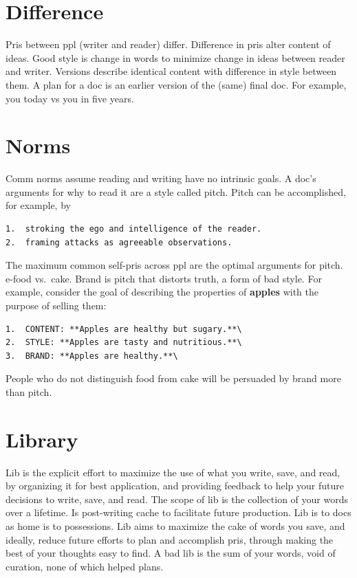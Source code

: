 \documentclass[
]{book}
\begin{document}
\hypertarget{difference}{%
\section{Difference}\label{difference}}

Pris between ppl (writer and reader) differ.
Difference in pris alter content of ideas.
Good style is change in words to minimize change in ideas between reader and writer.
Versions describe identical content with difference in style between them.
A plan for a doc is an earlier version of the (same) final doc.
For example, you today vs you in five years.

\hypertarget{comm-norm}{%
\section{Norms}\label{comm-norm}}

Comm norms assume reading and writing have no intrinsic goals.
A doc's arguments for why to read it are a style called pitch.
Pitch can be accomplished, for example, by

\begin{verbatim}
1.  stroking the ego and intelligence of the reader.
2.  framing attacks as agreeable observations.
\end{verbatim}

The maximum common self-pris across ppl are the optimal arguments for pitch. e-food vs.~cake.
Brand is pitch that distorts truth, a form of bad style.
For example, consider the goal of describing the properties of \textbf{apples} with the purpose of selling them:

\begin{verbatim}
1.  CONTENT: **Apples are healthy but sugary.**\
2.  STYLE: **Apples are tasty and nutritious.**\
3.  BRAND: **Apples are healthy.**\
\end{verbatim}

People who do not distinguish food from cake will be persuaded by brand more than pitch.

\hypertarget{library}{%
\section{Library}\label{library}}

Lib is the explicit effort to maximize the use of what you write, save, and read, by organizing it for best application, and providing feedback to help your future decisions to write, save, and read.
The scope of lib is the collection of your words over a lifetime.
Is post-writing cache to facilitate future production.
Lib is to docs as home is to possessions.
Lib aims to maximize the cake of words you save, and ideally, reduce future efforts to plan and accomplish pris, through making the best of your thoughts easy to find.
A bad lib is the sum of your words, void of curation, none of which helped plans.
\end{document}
